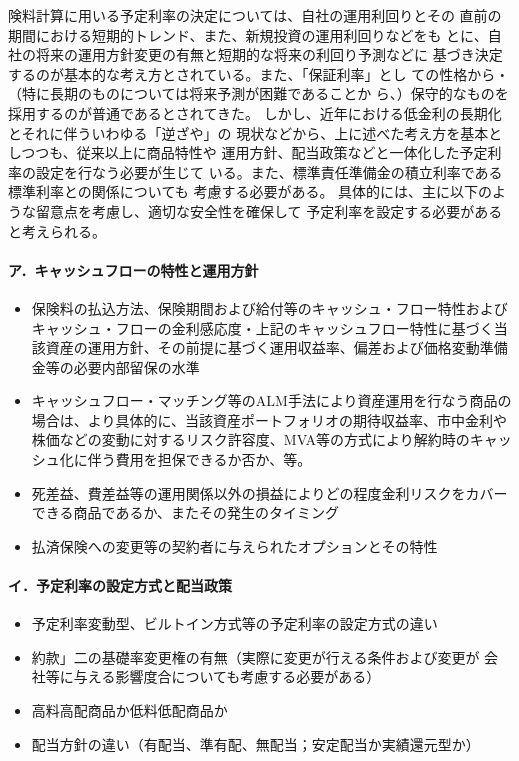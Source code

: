 \documentclass[report,gutter=10mm,fore-edge=10mm,uplatex,dvipdfmx]{jlreq}
\begin{document}

険料計算に用いる予定利率の決定については、自社の運用利回りとその
直前の期間における短期的トレンド、また、新規投資の運用利回りなどをも
とに、自社の将来の運用方針変更の有無と短期的な将来の利回り予測などに
基づき決定するのが基本的な考え方とされている。また、「保証利率」とし
ての性格から・（特に長期のものについては将来予測が困難であることか
ら、）保守的なものを採用するのが普通であるとされてきた。
しかし、近年における低金利の長期化とそれに伴ういわゆる「逆ざや」の
現状などから、上に述べた考え方を基本としつつも、従来以上に商品特性や
運用方針、配当政策などと一体化した予定利率の設定を行なう必要が生じて
いる。また、標準責任準備金の積立利率である標準利率との関係についても
考慮する必要がある。
具体的には、主に以下のような留意点を考慮し、適切な安全性を確保して
予定利率を設定する必要があると考えられる。

\paragraph{ア．キャッシュフローの特性と運用方針}

\begin{itemize}
 \item 保険料の払込方法、保険期間および給付等のキャッシュ・フロー特性およびキャッシュ・フローの金利感応度・上記のキャッシュフロー特性に基づく当該資産の運用方針、その前提に基づく運用収益率、偏差および価格変動準備金等の必要内部留保の水準
 \item キャッシュフロー・マッチング等のALM手法により資産運用を行なう商品の場合は、より具体的に、当該資産ポートフォリオの期待収益率、市中金利や株価などの変動に対するリスク許容度、MVA等の方式により解約時のキャッシュ化に伴う費用を担保できるか否か、等。
 \item 死差益、費差益等の運用関係以外の損益によりどの程度金利リスクをカバーできる商品であるか、またその発生のタイミング
 \item 払済保険への変更等の契約者に与えられたオプションとその特性
\end{itemize}
\paragraph{イ．予定利率の設定方式と配当政策}
\begin{itemize}
 \item 予定利率変動型、ビルトイン方式等の予定利率の設定方式の違い
 \item 約款」二の基礎率変更権の有無（実際に変更が行える条件および変更が
会社等に与える影響度合についても考慮する必要がある）
 \item 高料高配商品か低料低配商品か
 \item 配当方針の違い（有配当、準有配、無配当；安定配当か実績還元型か）
\end{itemize}
\end{document}
